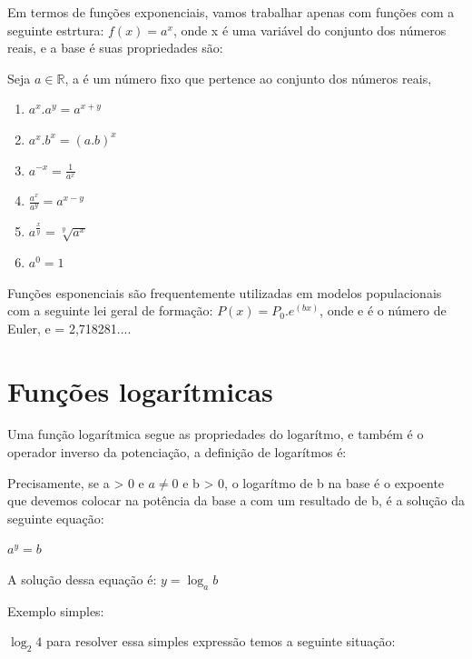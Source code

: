\begin{multicols*}{2}
            Em termos de funções exponenciais, vamos trabalhar apenas com funções com a seguinte estrtura:
            $f(x) = a^x$, onde x é uma variável do conjunto dos números reais, e a base é suas propriedades 		são:
            
            Seja $a \in \mathbb{R}$, a é um número fixo que pertence ao conjunto dos números reais, 
            \begin{enumerate}
            \item $a^{x}.a^{y} = a^{x+y}$
            \item $a^x.b^x = (a.b)^{x}$
            \item $a^{-x} = \frac{1}{a^x}$
            \item $\frac{a^x}{a^y} = a^{x - y}$
            \item $ a^{\frac{x}{y}}  = \sqrt[y]{a^x}$
            \item $a^0 = 1$
            \end{enumerate}
            
            Funções esponenciais são frequentemente utilizadas em modelos populacionais com a seguinte lei 			geral de formação: $P(x) = P_0 . e^{(bx)}$, onde e é o número de Euler, e = 2,718281....
        
            
            \section*{Funções logarítmicas}
            Uma função logarítmica segue as propriedades do logarítmo, e também é o operador inverso da 			potenciação, a definição de logarítmos é:
            
            \begin{theorem}
                Precisamente, se a > 0 e $a \ne 0$  e b > 0, o logarítmo de b na base é o expoente que 				devemos colocar na potência da base a com um resultado de b, é a solução da seguinte equação:
                
                $a^{y} = b$
                
                A solução dessa equação é: $y = \log_a b$
                
            \end{theorem}			
            
            Exemplo simples:
            
            $\log_2 4 $ para resolver essa simples expressão temos a seguinte situação:
            

\end{multicols*}
